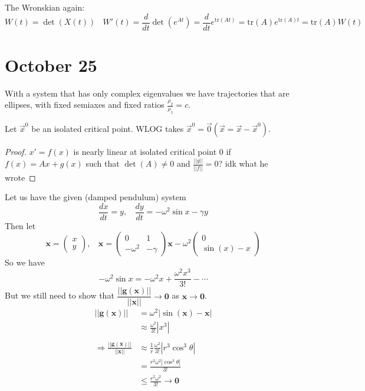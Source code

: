 \documentclass{article}
\theoremstyle{definition}
\begin{document}
        The Wronskian again:
        \[
            W(t) = \det(X(t)) \ \ \ \ W'(t) = \frac{d}{dt}\det(e^{At}) = \frac{d}{dt}e^{\text{tr}(At)} = \text{tr}(A)e^{\text{tr}(A)t} = \text{tr}(A)W(t)
        \]
\section*{October 25}
With a system that has only complex eigenvalues we have trajectories that are ellipses, with fixed semiaxes and fixed
ratios $\frac{\rho_2}{\rho_1} = c$.
\begin{mdframed}[]
    Let $\vec x^0$ be an isolated critical point. WLOG takes $\vec x ^0 = \vec 0 (\vec x = \vec x - \vec x ^ 0)$.
\end{mdframed}
\begin{proof}
    $x' = f(x)$ is nearly linear at isolated critical point $0$ if $f(x) = Ax + g(x)$ such that 
    $\det(A) \neq 0 $ and  $\frac{||g||}{||f||} = 0$? idk what he wrote
\end{proof}
 Let us have the given (damped pendulum) system
\[
    \frac{dx}{dt} = y, \ \ \ \ \frac{dy}{dt} = -\omega^2 \sin x - \gamma y
\]
Then let 
\[
    \bm x = \begin{pmatrix}
        x \\ y
    \end{pmatrix}, \ \ \ \ \bm x = \begin{pmatrix}
        0 & 1 \\
        -\omega^2 & - \gamma
    \end{pmatrix}\bm x - \omega^2 \begin{pmatrix}
        0 \\
        \sin (x) - x
    \end{pmatrix}
\]
So we have 
\[
    -\omega^2 \sin x = - \omega^2 x + \frac{\omega^2x^3}{3!} - \cdots
\]
But we still need to show that $\dfrac{||\bm g(\bm x)||}{||\bm x||} \rightarrow \bm 0$ as $\bm x \rightarrow \bm 0$.
\begin{align*}
    ||\bm g(\bm x)|| &= \omega^2 |\sin (\bm x) - \bm x|\\
    &\approx \frac{\omega^2}{3!}|x^3|\\\\
    \Longrightarrow \frac{||\bm g(\bm x)||}{||\bm x||} &\approx \frac{1}{r} \frac{\omega^2}{3!} | r^3 \cos^3 \theta | \\
    &= \frac{r^2\omega^2|\cos^3 \theta|}{3!} \\
    & \leq \frac{r^2\omega^2}{3!} \rightarrow \bm 0
\end{align*}
\end{document}
